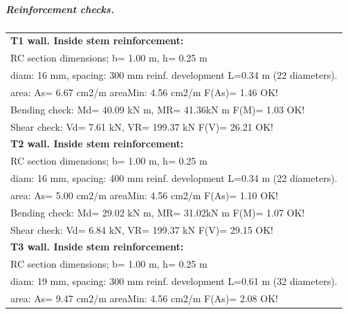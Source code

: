 \subparagraph{Reinforcement checks.}

\tablelasttail{\hline}
\begin{center}
\begin{supertabular}{|l|}
\hline
\textbf{T1 wall. Inside stem reinforcement:}\\
  RC section dimensions; b= 1.00 m, h= 0.25 m\\
  diam: 16 mm, spacing: 300 mm  reinf. development L=0.34 m (22 diameters).\\
  area: As=   6.67 cm2/m areaMin:   4.56 cm2/m  F(As)= 1.46 OK!\\
  Bending check: Md=  40.09 kN m, MR=  41.36kN m  F(M)= 1.03 OK!\\
  Shear check: Vd=   7.61 kN,  VR= 199.37 kN  F(V)= 26.21 OK!\\
\hline
\textbf{T2 wall. Inside stem reinforcement:}\\
  RC section dimensions; b= 1.00 m, h= 0.25 m\\
  diam: 16 mm, spacing: 400 mm  reinf. development L=0.34 m (22 diameters).\\
  area: As=   5.00 cm2/m areaMin:   4.56 cm2/m  F(As)= 1.10 OK!\\
  Bending check: Md=  29.02 kN m, MR=  31.02kN m  F(M)= 1.07 OK!\\
  Shear check: Vd=   6.84 kN,  VR= 199.37 kN  F(V)= 29.15 OK!\\
\hline
\textbf{T3 wall. Inside stem reinforcement:}\\
  RC section dimensions; b= 1.00 m, h= 0.25 m\\
  diam: 19 mm, spacing: 300 mm  reinf. development L=0.61 m (32 diameters).\\
  area: As=   9.47 cm2/m areaMin:   4.56 cm2/m  F(As)= 2.08 OK!\\

\end{supertabular}
\end{center}
